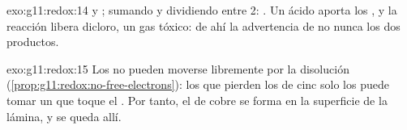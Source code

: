 \begin{solution}{exo:g11:redox:14}
 y ; sumando
y dividiendo entre 2: . Un ácido aporta
los  , y la reacción libera dicloro, un gas tóxico: de ahí
la advertencia de no  nunca los dos productos.
\end{solution}

\begin{solution}{exo:g11:redox:15}
Los  no pueden moverse libremente por la disolución
(\cref{prop:g11:redox:no-free-electrons}): los que pierden los  de
cinc solo los puede tomar un   que toque el . Por
tanto, el  de cobre se forma en la superficie de la lámina, y se
queda allí.
\end{solution}

